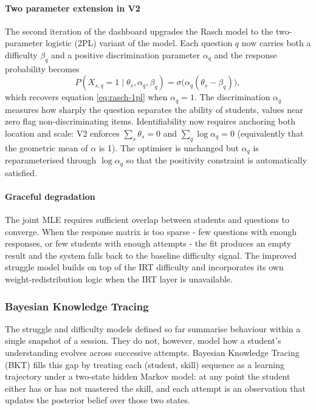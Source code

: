 \paragraph{Two parameter extension in V2}
The second iteration of the dashboard upgrades the Rasch model to the two-parameter logistic (2PL) variant of the model. 
Each question $q$ now carries both a difficulty $\beta_q$ and a positive discrimination parameter $\alpha_q$ and the response probability becomes
\begin{equation}
    P(X_{s,q} = 1 \mid \theta_s, \alpha_q, \beta_q)
    = \sigma\!\big(\alpha_q (\theta_s - \beta_q)\big),
    \label{eq:irt-2pl}
\end{equation}
which recovers equation \ref{eq:rasch-1pl} when $\alpha_q = 1$. 
The discrimination $\alpha_q$ measures how sharply the question separates the ability of students, values near zero flag non-discriminating items. 
Identifiability now requires anchoring both location and scale: V2 enforces $\sum_s \theta_s = 0$ and $\sum_q \log \alpha_q = 0$ (equivalently that the geometric mean of $\alpha$ is 1). 
The optimiser is unchanged but $\alpha_q$ is reparameterised through $\log \alpha_q$ so that the positivity constraint is automatically satisfied. 

\paragraph{Graceful degradation}
The joint MLE requires sufficient overlap between students and questions to converge. 
When the response matrix is too sparse - few questions with enough responses, or few students with enough attempts - the fit produces an empty result and the system falls back to the baseline difficulty signal. The improved struggle model builds on top of the IRT difficulty and incorporates its own weight-redistribution logic when the IRT layer is unavailable.

\subsubsection{Bayesian Knowledge Tracing} \label{sec: bkt}
The struggle and difficulty models defined so far summarise behaviour within a single snapshot of a session. 
They do not, however, model how a student's understanding evolves across successive attempts. 
Bayesian Knowledge Tracing (BKT) \cite{corbettKnowledgeTracingModeling1995} fills this gap by treating each (student, skill) sequence as a learning trajectory under a two-state hidden Markov model: at any point the student either has or has not mastered the skill, and each attempt is an observation that updates the posterior belief over those two states.

